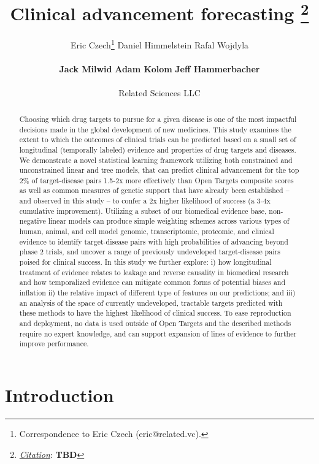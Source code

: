 \documentclass{article}
\title{Clinical advancement forecasting
\thanks{\textit{\underline{Citation}}: 
\textbf{TBD}} 
}
\author{
  Eric Czech\thanks{Correspondence to Eric Czech (eric@related.vc).} \hspace{0.2cm} 
  Daniel Himmelstein \hspace{0.2cm} 
  Rafal Wojdyla \hspace{0.2cm} 
  \\ \\
  \textbf{Jack Milwid} \hspace{0.2cm} 
  \textbf{Adam Kolom} \hspace{0.2cm} 
  \textbf{Jeff Hammerbacher}
  \\ \\
  Related Sciences LLC
}
\begin{document}
\maketitle


\def\evaluationDatasetPairCount{9010}
\def\topRankingPct{2}
\def\bottomRankingPct{98}

\begin{abstract}
Choosing which drug targets to pursue for a given disease is one of the most impactful decisions made in the global development of new medicines. This study examines the extent to which the outcomes of clinical trials can be predicted based on a small set of longitudinal (temporally labeled) evidence and properties of drug targets and diseases. We demonstrate a novel statistical learning framework utilizing both constrained and unconstrained linear and tree models, that can predict clinical advancement for the top \topRankingPct\% of target-disease pairs 1.5-2x more effectively than Open Targets composite scores as well as common measures of genetic support that have already been established -- and observed in this study -- to confer a 2x higher likelihood of success (a 3-4x cumulative improvement). Utilizing a subset of our biomedical evidence base, non-negative linear models can produce simple weighting schemes across various types of human, animal, and cell model genomic, transcriptomic, proteomic, and clinical evidence to identify target-disease pairs with high probabilities of advancing beyond phase 2 trials, and uncover a range of previously undeveloped target-disease pairs poised for clinical success. In this study we further explore: i) how longitudinal treatment of evidence relates to leakage and reverse causality in biomedical research and how temporalized evidence can mitigate common forms of potential biases and inflation ii) the relative impact of different type of features on our predictions; and iii) an analysis of the space of currently undeveloped, tractable targets predicted with these methods to have the highest likelihood of clinical success. To ease reproduction and deployment, no data is used outside of Open Targets and the described methods require no expert knowledge, and can support expansion of lines of evidence to further improve performance.
\end{abstract}

\section{Introduction}
\label{sec:introduction}
\end{document}
